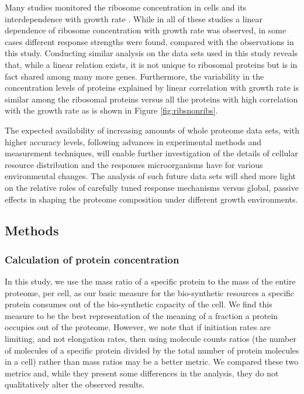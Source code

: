 \documentclass[notitlepage]{article}
\begin{document}
Many studies monitored the ribosome concentration in cells and its interdependence with growth rate \cite{Scott2010, Bremer1987, Schaechter1958, ingraham1983growth, Zaslaver2009}.
While in all of these studies a linear dependence of ribosome concentration with growth rate was observed, in some cases different response strengths were found, compared with the observations in this study.
Conducting similar analysis on the data sets used in this study reveals that, while a linear relation exists, it is not unique to ribosomal proteins but is in fact shared among many more genes.
Furthermore, the variability in the concentration levels of proteins explained by linear correlation with growth rate is similar among the ribosomal proteins versus all the proteins with high correlation with the growth rate as is shown in Figure \ref{fig:ribsnonribs}.

The expected availability of increasing amounts of whole proteome data sets, with higher accuracy levels, following advances in experimental methods and measurement techniques, will enable further investigation of the details of cellular resource distribution and the responses microorganisms have for various environmental changes.
The analysis of such future data sets will shed more light on the relative roles of carefully tuned response mechanisms versus global, passive effects in shaping the proteome composition under different growth environments.

\subsection{Methods}
\subsubsection{Calculation of protein concentration}
\label{protconc}
In this study, we use the mass ratio of a specific protein to the mass of the entire proteome, per cell, as our basic measure for the bio-synthetic resources a specific protein consumes out of the bio-synthetic capacity of the cell.
We find this measure to be the best representation of the meaning of a fraction a protein occupies out of the proteome.
However, we note that if initiation rates are limiting, and not elongation rates, then using molecule counts ratios (the number of molecules of a specific protein divided by the total number of protein molecules in a cell) rather than mass ratios may be a better metric.
We compared these two metrics and, while they present some differences in the analysis, they do not qualitatively alter the observed results.
\end{document}
